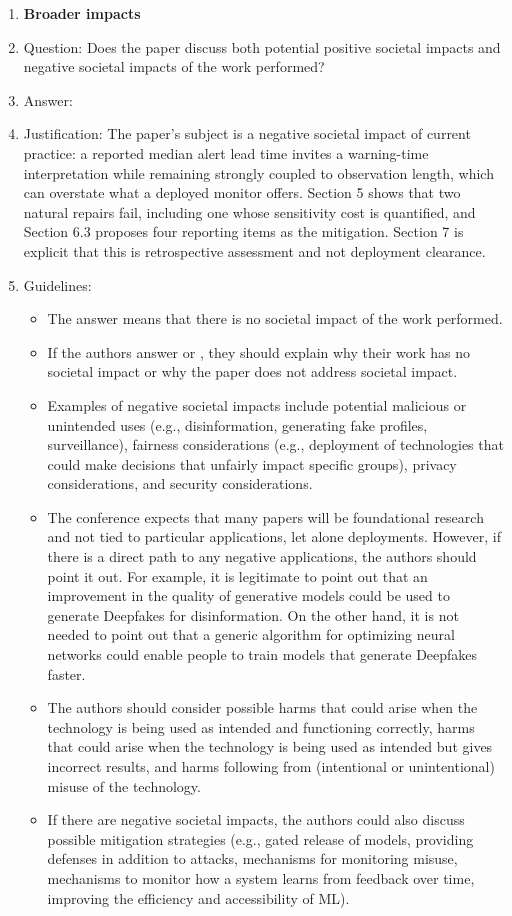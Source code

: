 \begin{enumerate}
\item {\bf Broader impacts}
    \item[] Question: Does the paper discuss both potential positive societal impacts and negative societal impacts of the work performed?
    \item[] Answer: \answerYes{}
    \item[] Justification: The paper's subject is a negative societal impact of current practice: a reported median alert lead time invites a warning-time interpretation while remaining strongly coupled to observation length, which can overstate what a deployed monitor offers. Section 5 shows that two natural repairs fail, including one whose sensitivity cost is quantified, and Section 6.3 proposes four reporting items as the mitigation. Section 7 is explicit that this is retrospective assessment and not deployment clearance.
    \item[] Guidelines:
    \begin{itemize}
        \item The answer \answerNA{} means that there is no societal impact of the work performed.
        \item If the authors answer \answerNA{} or \answerNo, they should explain why their work has no societal impact or why the paper does not address societal impact.
        \item Examples of negative societal impacts include potential malicious or unintended uses (e.g., disinformation, generating fake profiles, surveillance), fairness considerations (e.g., deployment of technologies that could make decisions that unfairly impact specific groups), privacy considerations, and security considerations.
        \item The conference expects that many papers will be foundational research and not tied to particular applications, let alone deployments. However, if there is a direct path to any negative applications, the authors should point it out. For example, it is legitimate to point out that an improvement in the quality of generative models could be used to generate Deepfakes for disinformation. On the other hand, it is not needed to point out that a generic algorithm for optimizing neural networks could enable people to train models that generate Deepfakes faster.
        \item The authors should consider possible harms that could arise when the technology is being used as intended and functioning correctly, harms that could arise when the technology is being used as intended but gives incorrect results, and harms following from (intentional or unintentional) misuse of the technology.
        \item If there are negative societal impacts, the authors could also discuss possible mitigation strategies (e.g., gated release of models, providing defenses in addition to attacks, mechanisms for monitoring misuse, mechanisms to monitor how a system learns from feedback over time, improving the efficiency and accessibility of ML).
    \end{itemize}
    

\end{enumerate}
